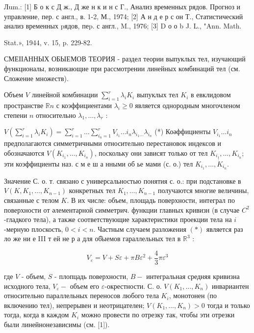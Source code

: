 \documentclass[10pt]{article}
\begin{document}
Лum.: [1] Б о к с Д ж., Д же н к и н с Г., Анализ временных рядов. Прогноз и управление, пер. с англ., в. 1-2, М., 1974; [2] А н д е р с он Т., Статистический анализ временных pядов, пеp. с англ., M., 1976; [3] D о о b J. L., "Ann. Math.

Stat.», 1944, v. 15, p. 229-82.



СМЕІІАННЫХ ОБЫЕМОВ ТЕОРИЯ - раздел теории выпуклых тел, изучающий функционалы, возникающие при рассмотрении линейных комбинаций тел (см. Сложение множеств).



Объем $V$ линейной комбинации $\sum_{i=1}^{r} \lambda_{i} K_{i}$ выпуклых тел $K_{i}$ в евклидовом пространстве $\mathbb{R} n$ с коэффициентами $\lambda_{i} \geqslant 0$ является однородным многочленом степени $n$ относительно $\lambda_{1}, \ldots, \lambda_{r}$ :



$V\left(\sum_{i=1}^{r} \lambda_{i} K_{i}\right)=\sum_{i=1}^{r} \ldots \sum_{i_{n}=1}^{r} V_{i_{1}} \ldots i_{n} \lambda_{i_{1} \ldots} \lambda_{i_{n}}$ (*) Коәффициенты $V_{i_{1}} \ldots i_{n}$ предполагаются симметричными относительно перестановок индексов и обозначаются $V\left(K_{i_{1}}, \ldots, K_{i_{n}}\right)$, поскольку они зависят только от тел $K_{i_{1}}, \ldots, K_{i_{n}}$; эти коэффициенты наз. с м е ш а нными об ье мами (с. о.) тел $K_{i_{1}}, \ldots, \dot{K}_{i_{n}}$.



Значение С. о. т. связано с универсальностью понятия с. о.: при подстановке в $V\left(K, K_{1}, \ldots, K_{n-1}\right)$ конкретных тел $K_{1}, \ldots, K_{n-1}$ получаются многие величины, связанные с телом $K$. В их числе: объем, площадь поверхности, интеграл по поверхности от әлементарной симметрич. функции главных кривизн (в случае $C^{2}$-гладкого тела), а также соответствующие характеристики проекции тела на $i$-мерную плоскость, $0<i<n$. Частным случаем разложения $(*)$ является раз ло же ни е III т ей не р а для об̆ыемов гараллельных тел в $\mathbb{R}^{3}$ :



\[

V_{\varepsilon}=V+S \varepsilon+\pi B \varepsilon^{2}+\frac{4}{3} \pi \varepsilon^{3}

\]



где $V$ - объем, $S$ - плопцадь поверхности, $B-$ интегральная средняя кривизна исходного тела, $V_{\varepsilon}-$ объем его $\varepsilon$-окрестности. С. о. $V\left(K_{1}, \ldots, K_{n}\right)$ инвариантен относительно параллельных переносов любого тела $K_{i}$, монотонен (по включению тел), непрерывен и неотрицателен; $V\left(K_{1}, \ldots, K_{n}\right)>0$ тогда и только тогда, когда в каждом $K_{i}$ можно провести по отрезку так, чтобы эти отрезки были линейнонезависимы (см. [1]).
\end{document}
